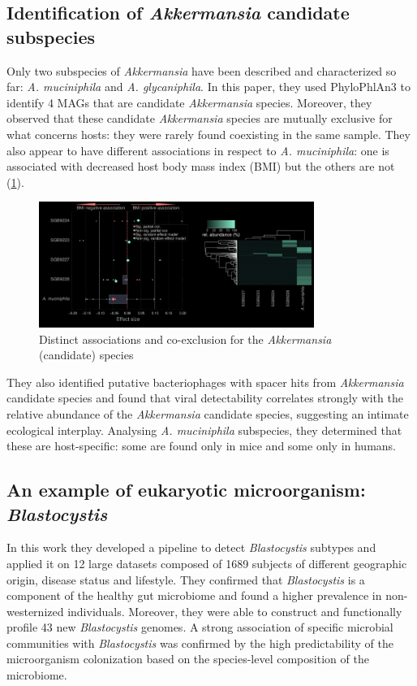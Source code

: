     \subsection{Identification of \emph{Akkermansia} candidate subspecies}
    Only two subspecies of \emph{Akkermansia} have been described and characterized so far: \emph{A. muciniphila} and \emph{A. glycaniphila}.
    In this paper, they used PhyloPhlAn3 to identify 4 MAGs that are candidate \emph{Akkermansia} species.
    Moreover, they observed that these candidate \emph{Akkermansia} species are mutually exclusive for what concerns hosts: they were rarely found coexisting in the same sample.
    They also appear to have different associations in respect to \emph{A. muciniphila}: one is associated with decreased host body mass index (BMI) but the others are not (\ref{fig:akk}).

    \begin{figure}[!h]
        \centering
        \includegraphics[width=0.8\textwidth]{akkermansia.png}
        \caption{\label{fig:akk}Distinct associations and co-exclusion for the \emph{Akkermansia} (candidate) species}
    \end{figure}

    They also identified putative bacteriophages with spacer hits from \emph{Akkermansia} candidate species and found that viral detectability correlates strongly with the relative abundance of the \emph{Akkermansia} candidate species, suggesting an intimate ecological interplay.
    Analysing \emph{A. muciniphila} subspecies, they determined that these are host-specific: some are found only in mice and some only in humans.

    \subsection{An example of eukaryotic microorganism: \emph{Blastocystis}}
    In this work they developed a pipeline to detect \emph{Blastocystis} subtypes and applied it on 12 large datasets composed of 1689 subjects of different geographic origin, disease status and lifestyle.
    They confirmed that \emph{Blastocystis} is a component of the healthy gut microbiome and found a higher prevalence in non-westernized individuals.
    Moreover, they were able to construct and functionally profile 43 new \emph{Blastocystis} genomes.
    A strong association of specific microbial communities with \emph{Blastocystis} was confirmed by the high predictability of the microorganism colonization based on the species-level composition of the microbiome.

